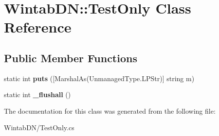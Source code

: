 \hypertarget{class_wintab_d_n_1_1_test_only}{
\section{WintabDN::TestOnly Class Reference}
\label{class_wintab_d_n_1_1_test_only}
}
\subsection*{Public Member Functions}
\begin{DoxyCompactItemize}
\item 
\hypertarget{class_wintab_d_n_1_1_test_only_a7e248d95679996e0ba12a2139adc4b8c}{
static int {\bfseries puts} (\mbox{[}MarshalAs(UnmanagedType.LPStr)\mbox{]} string m)}
\label{class_wintab_d_n_1_1_test_only_a7e248d95679996e0ba12a2139adc4b8c}

\item 
\hypertarget{class_wintab_d_n_1_1_test_only_a852b43e74f3fa109605f324780128e7b}{
static int {\bfseries \_\-flushall} ()}
\label{class_wintab_d_n_1_1_test_only_a852b43e74f3fa109605f324780128e7b}

\end{DoxyCompactItemize}


The documentation for this class was generated from the following file:\begin{DoxyCompactItemize}
\item 
WintabDN/TestOnly.cs\end{DoxyCompactItemize}
